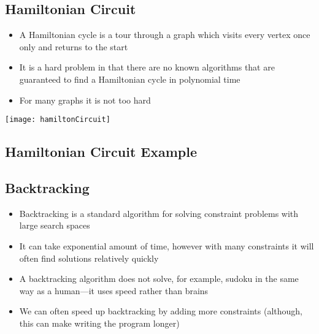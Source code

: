\begin{slide}
\section[-2]{Hamiltonian Circuit}

\begin{PauseHighLight}
  \begin{itemize}
  \item A Hamiltonian cycle is a tour through a graph which visits every
    vertex once only and returns to the start\pause
  \item It is a hard problem in that there are no known algorithms
    that are guaranteed to find a Hamiltonian cycle in polynomial time\pause
  \item For many graphs it is not too hard
  \end{itemize}
  \begin{center}
    \texttt{[image: hamiltonCircuit]}\pause
  \end{center}
\end{PauseHighLight}

\end{slide}


\begin{slide}
\section{Hamiltonian Circuit Example}
\pb\pause{}
\begin{center}
  \pause
\end{center}
\end{slide}


\begin{slide}
\section{Backtracking}

\begin{PauseHighLight}
  \begin{itemize}
  \item Backtracking is a standard algorithm for solving constraint
    problems with large search spaces\pause
  \item It can take exponential amount of time, however with many
    constraints it will often find solutions relatively quickly\pause
  \item A backtracking algorithm does not solve, for example, sudoku in the
    same way as a human\pause---it uses speed rather than brains\pauseb
  \item We can often speed up backtracking by adding more constraints
    (although, this can make writing the program longer)\pause
  \end{itemize}
\end{PauseHighLight}

\end{slide}


